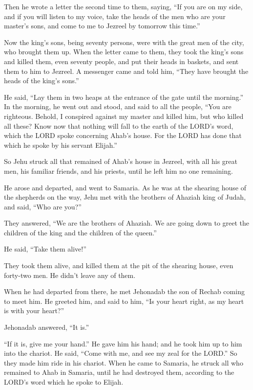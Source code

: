  Then he wrote a letter the second time to them, saying,
``If you are on my side, and if you will listen to my voice, take the
heads of the men who are your master's sons, and come to me to Jezreel
by tomorrow this time.''

Now the king's sons, being seventy persons, were with the great men of
the city, who brought them up.  When the letter came to
them, they took the king's sons and killed them, even seventy people,
and put their heads in baskets, and sent them to him to Jezreel.
 A messenger came and told him, ``They have brought the
heads of the king's sons.''

He said, ``Lay them in two heaps at the entrance of the gate until the
morning.''  In the morning, he went out and stood, and said
to all the people, ``You are righteous. Behold, I conspired against my
master and killed him, but who killed all these?  Know now
that nothing will fall to the earth of the LORD's word, which the LORD
spoke concerning Ahab's house. For the LORD has done that which he spoke
by his servant Elijah.''

 So Jehu struck all that remained of Ahab's house in
Jezreel, with all his great men, his familiar friends, and his priests,
until he left him no one remaining.

 He arose and departed, and went to Samaria. As he was at
the shearing house of the shepherds on the way,  Jehu met
with the brothers of Ahaziah king of Judah, and said, ``Who are you?''

They answered, ``We are the brothers of Ahaziah. We are going down to
greet the children of the king and the children of the queen.''

 He said, ``Take them alive!''

They took them alive, and killed them at the pit of the shearing house,
even forty-two men. He didn't leave any of them.

 When he had departed from there, he met Jehonadab the son
of Rechab coming to meet him. He greeted him, and said to him, ``Is your
heart right, as my heart is with your heart?''

Jehonadab answered, ``It is.''

``If it is, give me your hand.'' He gave him his hand; and he took him
up to him into the chariot.  He said, ``Come with me, and
see my zeal for the LORD.'' So they made him ride in his chariot.
 When he came to Samaria, he struck all who remained to
Ahab in Samaria, until he had destroyed them, according to the LORD's
word which he spoke to Elijah.

